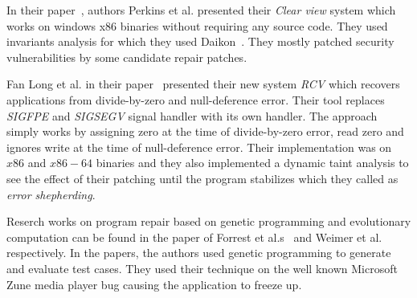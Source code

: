 {
In their paper~\cite{conf/sosp/PerkinsKLABCPSSSWZER09}, authors Perkins et al.
presented their \emph{Clear view} system which works on windows x86 binaries
without requiring any source code. They used invariants analysis for which they
used Daikon~\cite{DBLP:journals/scp/ErnstPGMPTX07}. They mostly patched security
vulnerabilities by some candidate repair patches.

Fan Long et al. in their paper~\cite{conf/pldi/LongSR14} presented their new
system \emph{RCV} which recovers applications from divide-by-zero and
null-deference error. Their tool replaces \emph{SIGFPE} and \emph{SIGSEGV}
signal handler with its own handler. The approach simply works by assigning zero
at the time of divide-by-zero error, read zero and ignores write at the time of
null-deference error. Their implementation was on $x86$ and $x86-64$ binaries
and they also implemented a dynamic taint analysis to see the effect of their
patching until the program stabilizes which they called as \emph{error
shepherding}.

Reserch works on program repair based on genetic programming and evolutionary
computation can be found in the paper of Forrest et al.s~\cite{conf/gecco/2009g}
and Weimer et al.~\cite{DBLP:journals/cacm/WeimerFGN10} respectively. In the
papers, the authors used genetic programming to generate and evaluate test
cases. They used their technique on the well known Microsoft Zune media player
bug causing the application to freeze up.
}


